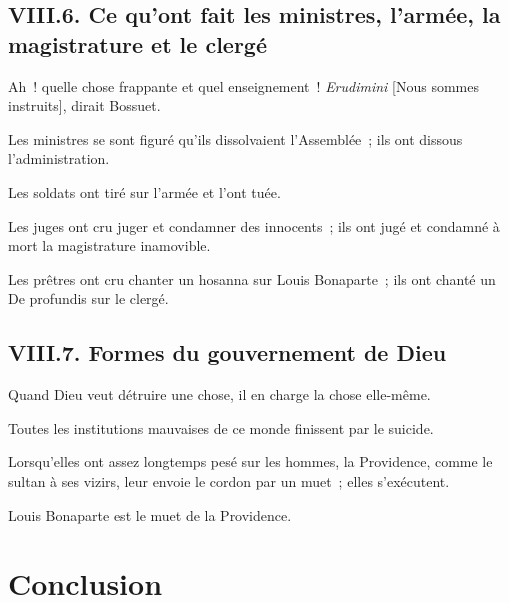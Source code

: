 \documentclass[french,twoside]{book} %
\begin{document}
\subsection[{VIII.6. Ce qu’ont fait les ministres, l’armée, la magistrature et le clergé}]{VIII.6. Ce qu’ont fait les ministres, l’armée, la magistrature et le clergé}
\noindent Ah ! quelle chose frappante et quel enseignement ! \emph{Erudimini} [Nous sommes instruits], dirait Bossuet.\par
Les ministres se sont figuré qu’ils dissolvaient l’Assemblée ; ils ont dissous l’administration.\par
Les soldats ont tiré sur l’armée et l’ont tuée.\par
Les juges ont cru juger et condamner des innocents ; ils ont jugé et condamné à mort la magistrature inamovible.\par
Les prêtres ont cru chanter un hosanna sur Louis Bonaparte ; ils ont chanté un De profundis sur le clergé.
\subsection[{VIII.7. Formes du gouvernement de Dieu}]{VIII.7. Formes du gouvernement de Dieu}
\noindent Quand Dieu veut détruire une chose, il en charge la chose elle-même.\par
Toutes les institutions mauvaises de ce monde finissent par le suicide.\par
Lorsqu’elles ont assez longtemps pesé sur les hommes, la Providence, comme le sultan à ses vizirs, leur envoie le cordon par un muet ; elles s’exécutent.\par
Louis Bonaparte est le muet de la Providence.
\section[{Conclusion}]{Conclusion}\renewcommand{\leftmark}{Conclusion}
\end{document}

